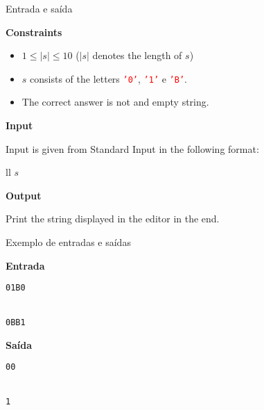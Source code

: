 \begin{frame}[fragile]{Entrada e saída}

\textbf{Constraints}

\begin{itemize}
    \item $1\leq |s|\leq 10$ ($|s|$ denotes the length of $s$)
    \item $s$ consists of the letters \texttt{\textcolor{red}{'0'}}, \texttt{\textcolor{red}{'1'}}
        e \texttt{\textcolor{red}{'B'}}.
    \item The correct answer is not and empty string.
\end{itemize}

\textbf{Input}

Input is given from Standard Input in the following format:
\begin{atcoderio}{ll}
$s$\\
\end{atcoderio}

\textbf{Output}

Print the string displayed in the editor in the end.

\end{frame}

\begin{frame}[fragile]{Exemplo de entradas e saídas}

\begin{minipage}[t]{0.45\textwidth}
\textbf{Entrada}
\begin{verbatim}
01B0


0BB1
\end{verbatim}
\end{minipage}
\begin{minipage}[t]{0.5\textwidth}
\textbf{Saída}
\begin{verbatim}
00


1
\end{verbatim}
\end{minipage}
\end{frame}

